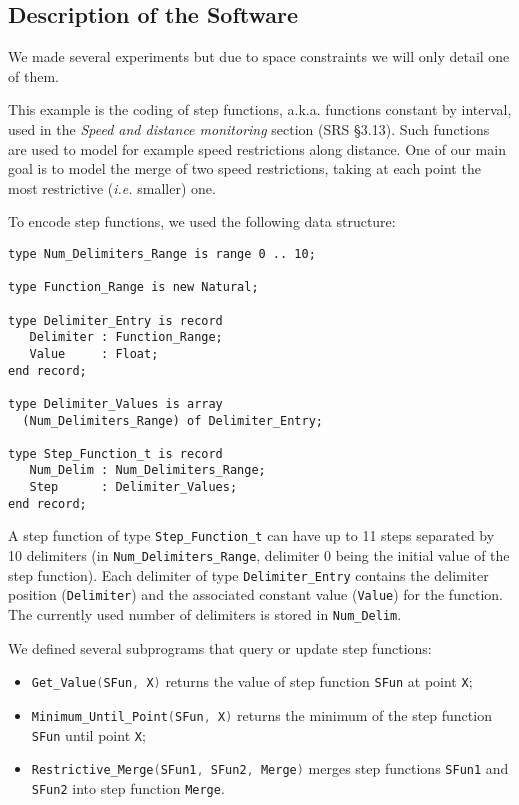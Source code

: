 \documentclass[10pt,a4paper,twocolumn]{article}
\newcommand{\ie}{\textit{i.e.}\xspace}
\newcommand{\aka}{a.k.a.\xspace}
\newcommand{\SPARK}[1]{\lstinline[language=Ada,basicstyle={\footnotesize
      \sffamily},framesep=0pt]$#1$}
\begin{document}
\subsection{Description of the Software}

We made several experiments but due to space constraints we will only
detail one of them.

This example is the coding of step functions, \aka functions
constant by interval, used in the \textit{Speed and distance monitoring}
section (SRS §3.13). Such functions are used to model for example
speed restrictions along distance. One of our main goal is to model
the merge of two speed restrictions, taking at each point the most
restrictive (\ie smaller) one.

To encode step functions, we used the following data structure:
\begin{lstlisting}
type Num_Delimiters_Range is range 0 .. 10;

type Function_Range is new Natural;

type Delimiter_Entry is record
   Delimiter : Function_Range;
   Value     : Float;
end record;

type Delimiter_Values is array
  (Num_Delimiters_Range) of Delimiter_Entry;

type Step_Function_t is record
   Num_Delim : Num_Delimiters_Range;
   Step      : Delimiter_Values;
end record;
\end{lstlisting}

A step function of type \SPARK{Step_Function_t} can have up to 11
steps separated by 10 delimiters (in \SPARK{Num_Delimiters_Range},
delimiter 0 being the initial value of the step function). Each
delimiter of type \SPARK{Delimiter_Entry} contains the delimiter
position (\SPARK{Delimiter}) and the associated constant value
(\SPARK{Value}) for the function. The currently used number of
delimiters is stored in \SPARK{Num_Delim}.

We defined several subprograms that query or update step functions:
\begin{itemize}
\item \SPARK{Get_Value(SFun, X)} returns the value of step function \SPARK{SFun}
  at point \SPARK{X};
\item \SPARK{Minimum_Until_Point(SFun, X)} returns the minimum of the step
  function \SPARK{SFun} until point \SPARK{X};
\item \SPARK{Restrictive_Merge(SFun1, SFun2, Merge)} merges step functions
  \SPARK{SFun1} and \SPARK{SFun2} into step function \SPARK{Merge}.
\end{itemize}
\end{document}
